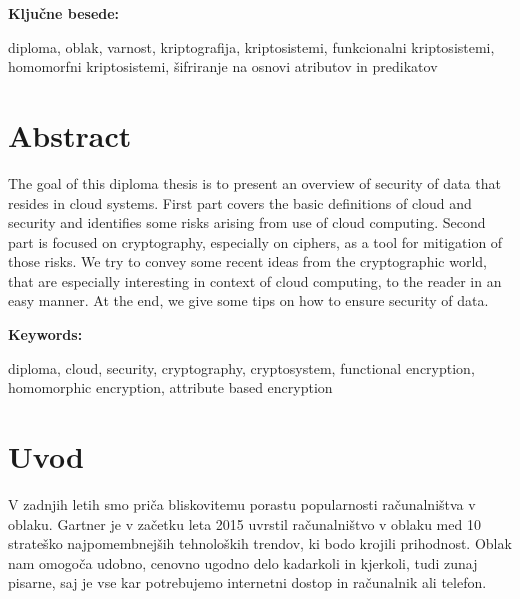 \documentclass[12pt,a4paper,openany,tikz]{book}
\theoremstyle{plain}
\theoremstyle{definition}
\begin{document}
\vspace{1.3cm}
\noindent
{\large \bf Ključne besede:}

\vspace{0.5cm}
\noindent
diploma, oblak, varnost, kriptografija, kriptosistemi, funkcionalni kriptosistemi, homomorfni kriptosistemi, šifriranje na osnovi atributov in predikatov

\chapter*{Abstract}

The goal of this diploma thesis is to present an overview of security of data that resides in cloud systems. First part covers the basic definitions of cloud and security and identifies some risks arising from use of cloud computing. Second part is focused on cryptography, especially on ciphers, as a tool for mitigation of those risks. We try to convey some recent ideas from the cryptographic world, that are especially interesting in context of cloud computing, to the reader in an easy manner. At the end, we give some tips on how to ensure security of data.

\vspace{1.3cm}
\noindent
{\large \bf Keywords:}

\vspace{0.5cm}
\noindent
diploma, cloud, security, cryptography, cryptosystem, functional encryption, homomorphic encryption, attribute based encryption


\mainmatter

\pagestyle{fancy}
\setcounter{page}{1}
\chapter{Uvod}

V zadnjih letih smo priča bliskovitemu porastu popularnosti računalništva v oblaku. Gartner je v začetku leta 2015 uvrstil računalništvo v oblaku med 10 strateško najpomembnejših tehnoloških trendov, ki bodo krojili prihodnost. Oblak nam omogoča udobno, cenovno ugodno delo kadarkoli in kjerkoli, tudi zunaj pisarne, saj je vse kar potrebujemo internetni dostop in računalnik ali telefon.
\end{document}
